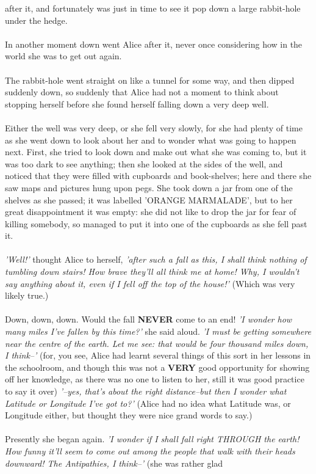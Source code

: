 \documentclass[12pt]{article}
\begin{document}
after it, and fortunately was just in time to see it pop down a large
rabbit-hole under the hedge.\\\\In another moment down went Alice after it, never once considering how
in the world she was to get out again.\\\\The rabbit-hole went straight on like a tunnel for some way, and then
dipped suddenly down, so suddenly that Alice had not a moment to think
about stopping herself before she found herself falling down a very deep
well.\\\\Either the well was very deep, or she fell very slowly, for she had
plenty of time as she went down to look about her and to wonder what was
going to happen next. First, she tried to look down and make out what
she was coming to, but it was too dark to see anything; then she
looked at the sides of the well, and noticed that they were filled with
cupboards and book-shelves; here and there she saw maps and pictures
hung upon pegs. She took down a jar from one of the shelves as
she passed; it was labelled \textmd{'ORANGE MARMALADE'}, but to her great
disappointment it was empty: she did not like to drop the jar for fear
of killing somebody, so managed to put it into one of the cupboards as
she fell past it.\\\\\textit{'Well!'} thought Alice to herself, \textit{'after such a fall as this, I shall
think nothing of tumbling down stairs! How brave they'll all think me at
home! Why, I wouldn't say anything about it, even if I fell off the top
of the house!'} (Which was very likely true.)\\\\Down, down, down. Would the fall \textbf{NEVER} come to an end! \textit{'I wonder how
    many miles I've fallen by this time?'} she said aloud. \textit{'I must be getting
somewhere near the centre of the earth. Let me see: that would be four
thousand miles down, I think--'} (for, you see, Alice had learnt several
things of this sort in her lessons in the schoolroom, and though this
was not a \textbf{VERY} good opportunity for showing off her knowledge, as there
was no one to listen to her, still it was good practice to say it over)
\textit{'--yes, that's about the right distance--but then I wonder what Latitude
    or Longitude I've got to?'} (Alice had no idea what Latitude was, or
Longitude either, but thought they were nice grand words to say.)\\\\Presently she began again. \textit{'I wonder if I shall fall right THROUGH the
earth! How funny it'll seem to come out among the people that walk with
their heads downward! The Antipathies, I think--'} (she was rather glad
\end{document}
